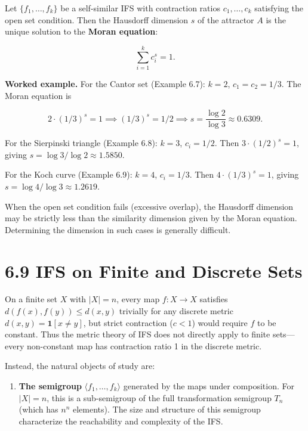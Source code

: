 \begin{theorem}
Let $\{ f_1, \ldots, f_k\} $ be a self-similar IFS with contraction ratios $c_1, \ldots, c_k$ satisfying the open set condition. Then the Hausdorff dimension $s$ of the attractor $A$ is the unique solution to the \textbf{Moran equation}:

\[
\sum_{i=1}^{k} c_i^s = 1.
\]

\textbf{Worked example.} For the Cantor set (Example 6.7): $k = 2$, $c_1 = c_2 = 1/3$. The Moran equation is

\[
2 \cdot (1/3)^s = 1 \implies (1/3)^s = 1/2 \implies s = \frac{\log 2}{\log 3} \approx 0.6309.
\]

For the Sierpinski triangle (Example 6.8): $k = 3$, $c_i = 1/2$. Then $3 \cdot (1/2)^s = 1$, giving $s = \log 3 / \log 2 \approx 1.5850$.

For the Koch curve (Example 6.9): $k = 4$, $c_i = 1/3$. Then $4 \cdot (1/3)^s = 1$, giving $s = \log 4 / \log 3 \approx 1.2619$.

When the open set condition fails (excessive overlap), the Hausdorff dimension may be strictly less than the similarity dimension given by the Moran equation. Determining the dimension in such cases is generally difficult.
\end{theorem}

\section{6.9 IFS on Finite and Discrete Sets}

On a finite set $X$ with $|X| = n$, every map $f : X \to X$ satisfies $d(f(x), f(y)) \le d(x, y)$ trivially for any discrete metric $d(x, y) = \mathbf{1}[x \ne y]$, but strict contraction ($c < 1$) would require $f$ to be constant. Thus the metric theory of IFS does not directly apply to finite sets—every non-constant map has contraction ratio 1 in the discrete metric.

Instead, the natural objects of study are:

\begin{enumerate}
  \item \textbf{The semigroup} $\langle f_1, \ldots, f_k \rangle$ generated by the maps under composition. For $|X| = n$, this is a sub-semigroup of the full transformation semigroup $T_n$ (which has $n^n$ elements). The size and structure of this semigroup characterize the reachability and complexity of the IFS.
\end{enumerate}

